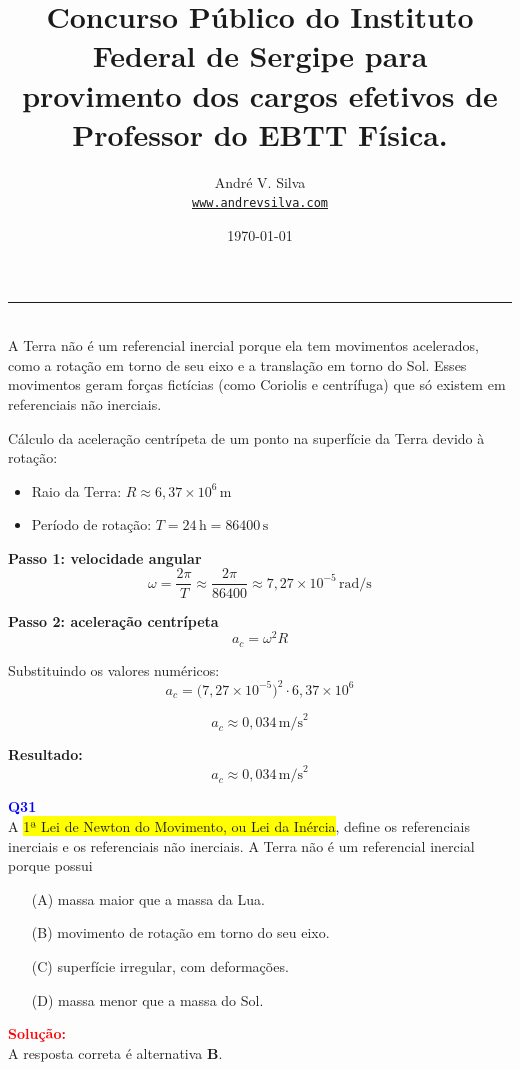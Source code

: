 \documentclass[a4paper,12pt]{article}
\title{Concurso Público do Instituto Federal de Sergipe para provimento dos cargos
efetivos de Professor do EBTT \textbf{\large F\'isica}.}
\author{Andr\'e V. Silva \\ \texttt{\url{www.andrevsilva.com}}}
\date{\today}
\begin{document}
\maketitle
\noindent\rule{\linewidth}{0.4pt}\\

\justifying
\colorbox{yellow!30}{A Terra não é um referencial inercial porque ela tem movimentos acelerados}, como a rotação em torno de seu eixo 
e a translação em torno do Sol. Esses movimentos geram \colorbox{yellow!30}{forças fictícias (como Coriolis e centrífuga)} que só existem em referenciais não inerciais.

Cálculo da aceleração centrípeta de um ponto na superfície da Terra devido à rotação:

\begin{itemize}
  \item Raio da Terra: \( R \approx 6,37 \times 10^6 \, \mathrm{m} \)
  \item Período de rotação: \( T = 24 \, \mathrm{h} = 86400 \, \mathrm{s} \)
\end{itemize}

\textbf{Passo 1: velocidade angular}
\[
\omega = \frac{2\pi}{T} \approx \frac{2\pi}{86400} \approx 7,27 \times 10^{-5} \, \mathrm{rad/s}
\]

\textbf{Passo 2: aceleração centrípeta}
\[
a_c = \omega^2 R
\]

Substituindo os valores numéricos:
\[
a_c = \bigl(7,27 \times 10^{-5}\bigr)^2 \cdot 6,37 \times 10^6
\]

\[
a_c \approx 0,034 \, \mathrm{m/s}^2
\]

\textbf{Resultado:}
\[
\boxed{a_c \approx 0,034 \, \mathrm{m/s}^2}
\]

\begin{flushleft}
\textbf{\textcolor{blue}{\Large Q31}}\\
\noindent
A \colorbox{yellow}{1ª Lei de Newton do Movimento, ou Lei da Inércia}, define 
os referenciais inerciais e os referenciais não inerciais. \colorbox{green!40}{A 
Terra não é um referencial inercial porque possui}

\begin{itemize}
\item[(A)] massa maior que a massa da Lua.
\item[(B)] movimento de rotação em torno do seu eixo.
\item[(C)] superfície irregular, com deformações.
\item[(D)] massa menor que a massa do Sol.
\end{itemize}

\vspace{0.5cm}

\textcolor{red}{\textbf{Solução:}}\\

A resposta correta é alternativa \colorbox{green!50}{\textbf{B}}.
\end{flushleft}
\end{document}

